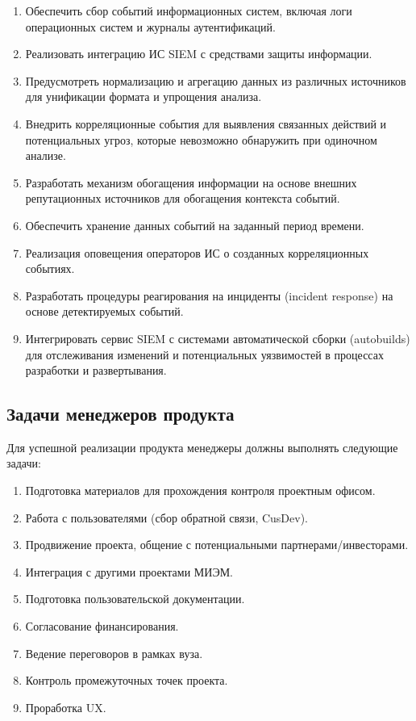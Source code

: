 \documentclass[14pt, a4paper]{extarticle}
\begin{document}
\begin{enumerate}
\item Обеспечить сбор событий информационных систем, включая логи операционных систем и журналы аутентификаций.
\item Реализовать интеграцию ИС SIEM с средствами защиты информации.
\item Предусмотреть нормализацию и агрегацию данных из различных источников для унификации формата и упрощения анализа.
\item Внедрить корреляционные события для выявления связанных действий и потенциальных угроз, которые невозможно обнаружить при одиночном анализе.
\item Разработать механизм обогащения информации на основе внешних репутационных источников для обогащения контекста событий.
\item Обеспечить хранение данных событий на заданный период времени.
\item Реализация оповещения операторов ИС о созданных корреляционных событиях.
\item Разработать процедуры реагирования на инциденты (incident response) на основе детектируемых событий.
\item Интегрировать сервис SIEM с системами автоматической сборки (autobuilds) для отслеживания изменений и потенциальных уязвимостей в процессах разработки и развертывания.
\end{enumerate}

\subsection{Задачи менеджеров продукта}

Для успешной реализации продукта менеджеры должны выполнять следующие задачи:

\begin{enumerate}
\item Подготовка материалов для прохождения контроля проектным офисом.
\item Работа с пользователями (сбор обратной связи, CusDev).
\item Продвижение проекта, общение с потенциальными партнерами/инвесторами.
\item Интеграция с другими проектами МИЭМ.
\item Подготовка пользовательской документации.
\item Согласование финансирования.
\item Ведение переговоров в рамках вуза.
\item Контроль промежуточных точек проекта.
\item Проработка UX.
\end{enumerate}
\end{document}
